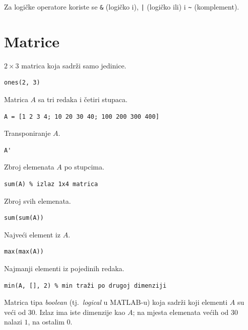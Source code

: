 \documentclass[a4paper, 10pt]{article}
\begin{document}
Za logičke operatore koriste se \texttt{\&} (logičko i), \texttt{|} (logičko ili) i \texttt{\textasciitilde} (komplement).


\section{Matrice}
\label{sec:matrice}

$2 \times 3$ matrica koja sadrži samo jedinice.

\begin{lstlisting}
ones(2, 3)
\end{lstlisting}

Matrica $A$ sa tri redaka i četiri stupaca.

\begin{lstlisting}
A = [1 2 3 4; 10 20 30 40; 100 200 300 400]
\end{lstlisting}

Transponiranje $A$.

\begin{lstlisting}
A'
\end{lstlisting}

Zbroj elemenata $A$ po stupcima.

\begin{lstlisting}
sum(A) % izlaz 1x4 matrica
\end{lstlisting}

Zbroj svih elemenata.

\begin{lstlisting}
sum(sum(A))
\end{lstlisting}

Najveći element iz $A$.

\begin{lstlisting}
max(max(A))
\end{lstlisting}

Najmanji elementi iz pojedinih redaka.

\begin{lstlisting}
min(A, [], 2) % min traži po drugoj dimenziji
\end{lstlisting}

Matrica tipa \emph{boolean} (tj.\ \emph{logical} u MATLAB-u) koja sadrži koji elementi $A$ su veći od $30$. Izlaz ima iste dimenzije kao $A$; na mjesta elemenata većih od $30$ nalazi $1$, na ostalim $0$.
\end{document}
